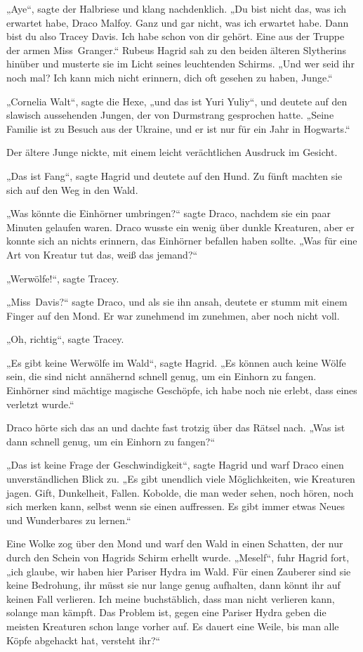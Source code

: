 {„Aye“, sagte der Halbriese und klang nachdenklich. „Du bist nicht das, was ich erwartet habe, Draco Malfoy. Ganz und gar nicht, was ich erwartet habe. Dann bist du also Tracey Davis. Ich habe schon von dir gehört. Eine aus der Truppe der armen Miss~Granger.“ Rubeus Hagrid sah zu den beiden älteren Slytherins hinüber und musterte sie im Licht seines leuchtenden Schirms. „Und wer seid ihr noch mal? Ich kann mich nicht erinnern, dich oft gesehen zu haben, Junge.“

„Cornelia Walt“, sagte die Hexe, „und das ist Yuri Yuliy“, und deutete auf den slawisch aussehenden Jungen, der von Durmstrang gesprochen hatte. „Seine Familie ist zu Besuch aus der Ukraine, und er ist nur für ein Jahr in Hogwarts.“

Der ältere Junge nickte, mit einem leicht verächtlichen Ausdruck im Gesicht.

„Das ist Fang“, sagte Hagrid und deutete auf den Hund. Zu fünft machten sie sich auf den Weg in den Wald.

„Was könnte die Einhörner umbringen?“ sagte Draco, nachdem sie ein paar Minuten gelaufen waren. Draco wusste ein wenig über dunkle Kreaturen, aber er konnte sich an nichts erinnern, das Einhörner befallen haben sollte. „Was für eine Art von Kreatur tut das, weiß das jemand?“

„Werwölfe!“, sagte Tracey.

„Miss~Davis?“ sagte Draco, und als sie ihn ansah, deutete er stumm mit einem Finger auf den Mond. Er war zunehmend im zunehmen, aber noch nicht voll.

„Oh, richtig“, sagte Tracey.

„Es gibt keine Werwölfe im Wald“, sagte Hagrid. „Es können auch keine Wölfe sein, die sind nicht annähernd schnell genug, um ein Einhorn zu fangen. Einhörner sind mächtige magische Geschöpfe, ich habe noch nie erlebt, dass eines verletzt wurde.“

Draco hörte sich das an und dachte fast trotzig über das Rätsel nach. „Was ist dann schnell genug, um ein Einhorn zu fangen?“

„Das ist keine Frage der Geschwindigkeit“, sagte Hagrid und warf Draco einen unverständlichen Blick zu. „Es gibt unendlich viele Möglichkeiten, wie Kreaturen jagen. Gift, Dunkelheit, Fallen. Kobolde, die man weder sehen, noch hören, noch sich merken kann, selbst wenn sie einen auffressen. Es gibt immer etwas Neues und Wunderbares zu lernen.“

Eine Wolke zog über den Mond und warf den Wald in einen Schatten, der nur durch den Schein von Hagrids Schirm erhellt wurde. „Meself“, fuhr Hagrid fort, „ich glaube, wir haben hier Pariser Hydra im Wald. Für einen Zauberer sind sie keine Bedrohung, ihr müsst sie nur lange genug aufhalten, dann könnt ihr auf keinen Fall verlieren. Ich meine buchstäblich, dass man nicht verlieren kann, solange man kämpft. Das Problem ist, gegen eine Pariser Hydra geben die meisten Kreaturen schon lange vorher auf. Es dauert eine Weile, bis man alle Köpfe abgehackt hat, versteht ihr?“

}
